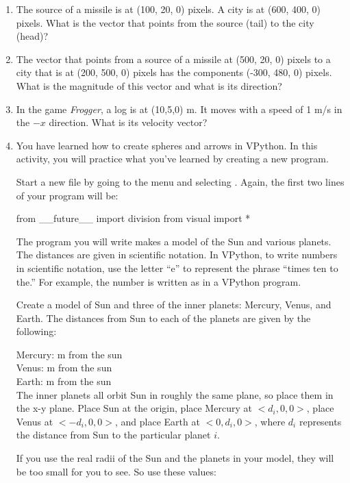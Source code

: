\begin{enumerate}
	\item The source of a missile is at (100, 20, 0) pixels. A city is at (600, 400, 0) pixels. What is the vector that points from the source (tail) to the city (head)?
	\item The vector that points from a source of a missile at (500, 20, 0) pixels to a city that is at (200, 500, 0) pixels has the components (-300, 480, 0) pixels. What is the magnitude of this vector and what is its direction?
	\item In the game \emph{Frogger}, a log is at (10,5,0) m. It moves with a speed of 1 m/s in the $-x$ direction. What is its velocity vector?
	\item You have learned how to create spheres and arrows in VPython. In this activity, you will practice what you've learned by creating a new program.

Start a new file by going to the  menu and selecting .  Again, the first two lines of your program will be:

\begin{myvpython}
from  __future__  import division
from visual import *
\end{myvpython}

The program you will write makes a model of the Sun and various planets.  The distances are given in scientific notation.  In VPython, to write numbers in scientific notation, use the letter ``e'' to represent the phrase ``times ten to the.''  For example, the number  is written as  in a VPython program.

Create a model of Sun and three of the inner planets:  Mercury, Venus, and Earth.  The distances from Sun to each of the planets are given by the following:

Mercury:  m from the sun\\
Venus:  m from the sun\\
Earth:   m from the sun\\

The inner planets all orbit Sun in roughly the same plane, so place them in the x-y plane.  Place Sun at the origin, place Mercury at $<d_i , 0, 0>$, place Venus at $< -d_i, 0, 0>$, and place Earth at $<0, d_i, 0>$, where $d_i$ represents the distance from Sun to the particular planet $i$.

If you use the real radii of the Sun and the planets in your model, they will be too small for you to see.  So use these values:\\


\end{enumerate}
